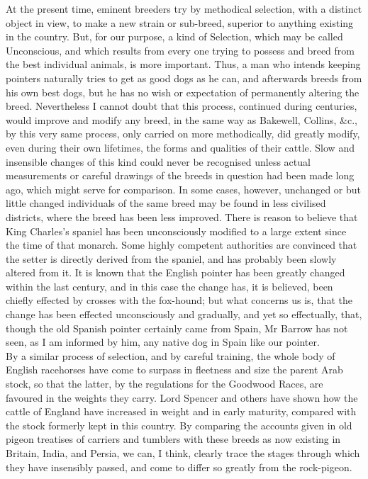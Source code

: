 \indent At the present time, eminent breeders try by methodical selection, with a distinct object in view, to make a new strain or sub-breed, superior to anything existing in the country. But, for our purpose, a kind of Selection, which may be called Unconscious, and which results from every one trying to possess and breed from the best individual animals, is more important. Thus, a man who intends keeping pointers naturally tries to get as good dogs as he can, and afterwards breeds from his own best dogs, but he has no wish or expectation of permanently altering the breed.  Nevertheless I cannot doubt that this process, continued during centuries, would improve and modify any breed, in the same way as Bakewell, Collins, \&c., by this very same process, only carried on more methodically, did greatly modify, even during their own lifetimes, the forms and qualities of their cattle. Slow and insensible changes of this kind could never be recognised unless actual measurements or careful drawings of the breeds in question had been made long ago, which might serve for comparison. In some cases, however, unchanged or but little changed individuals of the same breed may be found in less civilised districts, where the breed has been less improved. There is reason to believe that King Charles's spaniel has been unconsciously modified to a large extent since the time of that monarch. Some highly competent authorities are convinced that the setter is directly derived from the spaniel, and has probably been slowly altered from it. It is known that the English pointer has been greatly changed within the last century, and in this case the change has, it is believed, been chiefly effected by crosses with the fox-hound; but what concerns us is, that the change has been effected unconsciously and gradually, and yet so effectually, that, though the old Spanish pointer certainly came from Spain, Mr Barrow has not seen, as I am informed by him, any native dog in Spain like our pointer.  \\
\indent By a similar process of selection, and by careful training, the whole body of English racehorses have come to surpass in fleetness and size the parent Arab stock, so that the latter, by the regulations for the Goodwood Races, are favoured in the weights they carry. Lord Spencer and others have shown how the cattle of England have increased in weight and in early maturity, compared with the stock formerly kept in this country. By comparing the accounts given in old pigeon treatises of carriers and tumblers with these breeds as now existing in Britain, India, and Persia, we can, I think, clearly trace the stages through which they have insensibly passed, and come to differ so greatly from the rock-pigeon.  \\
